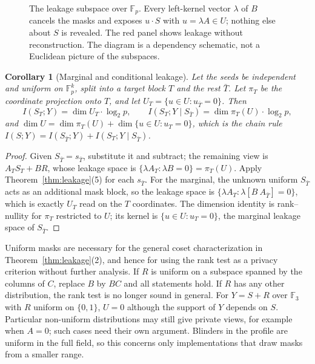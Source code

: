 \documentclass[pdflatex,sn-mathphys-num]{sn-jnl}%
\theoremstyle{plain}
\newtheorem{corollary}[theorem]{Corollary}
\theoremstyle{definition}
\newcommand{\F}{\mathbb{F}}
\begin{document}
\begin{figure}[t]
\centering
\figbox{}
\caption{The leakage subspace over $\mathbb F_p$. Every left-kernel vector $\lambda$ of $B$ cancels the masks and exposes $u\cdot S$ with $u=\lambda A\in U$; nothing else about $S$ is revealed. The red panel shows leakage without reconstruction. The diagram is a dependency schematic, not a Euclidean picture of the subspaces.}\label{fig:leakage}
\end{figure}

\begin{corollary}[Marginal and conditional leakage]\label{cor:condleak}
Let the seeds be independent and uniform on $\F_p^k$, split into a target block $T$ and the rest $\bar T$. Let $\pi_T$ be the coordinate projection onto $T$, and let $U_{T}=\{u\in U:u_{\bar T}=0\}$. Then
\[
 I(S_T;Y)=\dim U_T\cdot\log_2p,\qquad I(S_T;Y\mid S_{\bar T})=\dim\pi_T(U)\cdot\log_2p,
\]
and $\dim U=\dim\pi_T(U)+\dim\{u\in U:u_T=0\}$, which is the chain rule $I(S;Y)=I(S_{\bar T};Y)+I(S_T;Y\mid S_{\bar T})$.
\end{corollary}
\begin{proof}
Given $S_{\bar T}=s_{\bar T}$, substitute it and subtract; the remaining view is $A_TS_T+BR$, whose leakage space is $\{\lambda A_T:\lambda B=0\}=\pi_T(U)$. Apply Theorem~\ref{thm:leakage}(5) for each $s_{\bar T}$. For the marginal, the unknown uniform $S_{\bar T}$ acts as an additional mask block, so the leakage space is $\{\lambda A_T:\lambda[B\ A_{\bar T}]=0\}$, which is exactly $U_T$ read on the $T$ coordinates. The dimension identity is rank--nullity for $\pi_T$ restricted to $U$; its kernel is $\{u\in U:u_T=0\}$, the marginal leakage space of $S_{\bar T}$.
\end{proof}

Uniform masks are necessary for the general coset characterization in Theorem~\ref{thm:leakage}(2), and hence for using the rank test as a privacy criterion without further analysis. If $R$ is uniform on a subspace spanned by the columns of $C$, replace $B$ by $BC$ and all statements hold. If $R$ has any other distribution, the rank test is no longer sound in general. For $Y=S+R$ over $\F_3$ with $R$ uniform on $\{0,1\}$, $U=0$ although the support of $Y$ depends on $S$. Particular non-uniform distributions may still give private views, for example when $A=0$; such cases need their own argument. Blinders in the profile are uniform in the full field, so this concerns only implementations that draw masks from a smaller range.
\end{document}
